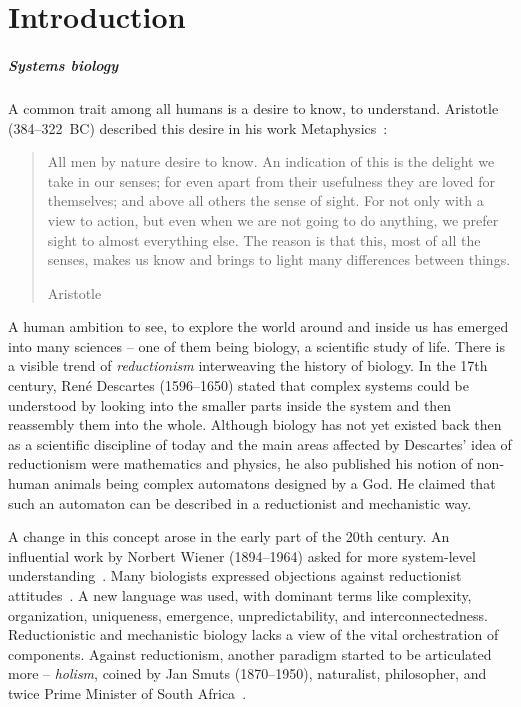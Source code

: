 \documentclass[
	digital, oneside, nosansbold, nocolorbold, nolot, nolof
]{fithesis4}
\theoremstyle{definition}
\theoremstyle{definition}
\begin{document}
\chapter{Introduction}

\paragraph{Systems biology}

A common trait among all humans is a desire to know, to understand. Aristotle
(384--322~BC) described this desire in his work Metaphysics~\cite{aristotle}:

\blockquote[Aristotle]{All men by nature desire to know. An indication of this
    is the delight we take in our senses; for even apart from their usefulness
    they are loved for themselves; and above all others the sense of sight. For
    not only with a view to action, but even when we are not going to do
    anything, we prefer sight to almost everything else. The reason is that
    this, most of all the senses, makes us know and brings to light many
    differences between things.}

A human ambition to see, to explore the world around and inside us has emerged
into many sciences -- one of them being biology, a scientific study of life.
There is a visible trend of \emph{reductionism} interweaving the history of
biology. In the 17th century, René Descartes (1596--1650) stated that complex
systems could be understood by looking into the smaller parts inside the system
and then reassembly them into the whole. Although biology has not yet existed
back then as a scientific discipline of today and the main areas affected by
Descartes' idea of reductionism were mathematics and physics, he also published
his notion of non-human animals being complex automatons designed by a God. He
claimed that such an automaton can be described in a reductionist and
mechanistic way.~\cite{systems_bio_hist, de_homine}

A change in this concept arose in the early part of the 20th century. An
influential work by Norbert Wiener (1894--1964) asked for more system-level
understanding~\cite{cybernetics}.  Many biologists expressed objections against
reductionist attitudes~\cite{woodger_biological, weiss_problem, ludwig_open}. A
new language was used, with dominant terms like complexity, organization,
uniqueness, emergence, unpredictability, and interconnectedness. Reductionistic
and mechanistic biology lacks a view of the vital orchestration of components.
Against reductionism, another paradigm started to be articulated more --
\emph{holism}, coined by Jan Smuts (1870--1950), naturalist, philosopher, and
twice Prime Minister of South Africa~\cite{smuts_holism}.
\end{document}
